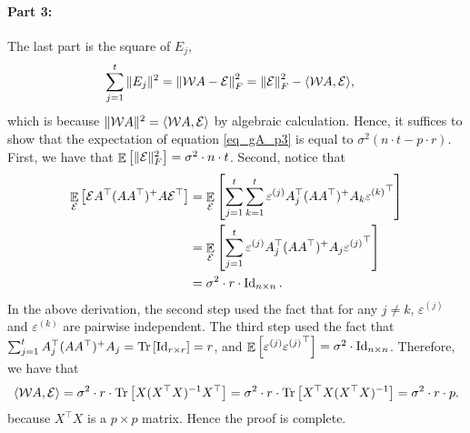 	\paragraph{Part 3:} The last part is the square of $E_j$,
	\begin{align}\label{eq_gA_p3}
		\sum_{j=1}^t \|E_j\|^2 &= \left\| {\mathcal W} A - \mathcal{E} \right\|_{F}^2
		= \left\| \mathcal{E} \right\|_{F}^2 - \langle {\mathcal W} A, \mathcal{E} \rangle,
	\end{align}
	which is because $\|{\mathcal W} A\|^2 = \langle {\mathcal W} A, \mathcal{E} \rangle$ by algebraic calculation.
	Hence, it suffices to show that the expectation of equation \eqref{eq_gA_p3} is equal to $\sigma^2 (n\cdot t - p\cdot r)$.
	First, we have that $\mathop{\mathbb{E}}\left[ \|\mathcal{E}\|_F^2 \right] = \sigma^2 \cdot n \cdot t$.
	Second, notice that
	\begin{align*}
			\mathop{\mathbb{E}}_{\mathcal{E}}\left[ \mathcal{E} A^{\top} (AA^{\top})^{+} A \mathcal{E}^{\top} \right]
		&= \mathop{\mathbb{E}}_{\mathcal{E}}\left[ \sum_{j=1}^t \sum_{k=1}^t \varepsilon^{(j)} A_j^{\top} (AA^{\top})^{+} A_k {\varepsilon^{(k)}}^{\top} \right] \\
		&= \mathop{\mathbb{E}}_{\mathcal{E}}\left[ \sum_{j=1}^t \varepsilon^{(j)} A_j^{\top} (AA^{\top})^{+} A_j {\varepsilon^{(j)}}^{\top} \right] \\
		&= \sigma^2 \cdot r \cdot \operatorname{Id}_{n\times n}.
	\end{align*}
	In the above derivation, the second step used the fact that for any $j\neq k$, $\varepsilon^{(j)}$ and $\varepsilon^{(k)}$ are pairwise independent.
	The third step used the fact that $\sum_{j=1}^t A_j^{\top} (AA^{\top})^{+} A_j = \operatorname{Tr}\left[\operatorname{Id}_{r\times r}\right] = r$, and $\mathop{\mathbb{E}}\left[ \varepsilon^{(j)} {\varepsilon^{(j)}}^{\top} \right] = \sigma^2 \cdot \operatorname{Id}_{n\times n}$.
	Therefore, we have that
	\begin{align*}
		\langle {\mathcal W} A, \mathcal{E} \rangle = \sigma^2 \cdot r \cdot \operatorname{Tr}\left[X(X^{\top} X)^{-1} X^{\top}\right] =  \sigma^2 \cdot r \cdot \operatorname{Tr}\left[ X^{\top}X(X^{\top} X)^{-1}\right]  = \sigma^2 \cdot r \cdot p.
	\end{align*}
   because $X^\top X$ is a $p\times p$ matrix.	
	Hence the proof is complete.


